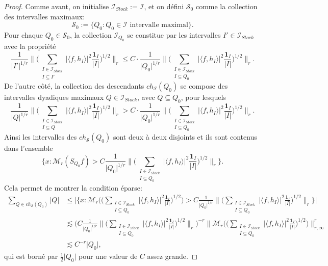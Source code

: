 \documentclass[11pt]{amsart}
\newcommand{\one}{\mathbf{1}}
\newcommand{\ii}{\mathscr}
\newcommand{\ic}{\mathcal}
\begin{document}
\begin{proof}
Comme avant, on initialise $\ii I_{Stock}:= \ii I$, et on d\'efini $\ic S_0$ comme la collection des intervalles maximaux: 
$$\ic S_0:=\lbrace Q_0: Q_0 \in \ii I \text{  intervalle maximal}  \rbrace.$$
Pour chaque $Q_0 \in \ic S_0$, la collection $\ii I_{Q_0}$ se constitue par les intervalles $I' \in \ii I_{Stock}$ avec la propri\'et\'e
\[
\frac{1}{\vert I' \vert^{1/r}} \big\| \big(  \sum_{\substack{I \in \ii I_{Stock} \\ I \subseteq I'}}  \vert \langle f, h_I  \rangle \vert^2 \frac{\one_I}{\vert I \vert} \big)^{1/2} \big\|_r \leq C \cdot \frac{1}{\vert Q_0 \vert^{1/r}} \big\| \big(  \sum_{\substack{I \in \ii I_{Stock} \\ I \subseteq Q_0}} \vert \langle f, h_I  \rangle \vert^2 \frac{\one_I}{\vert I \vert} \big)^{1/2} \big\|_r.
\]
De l'autre c\^ot\'e, la collection des descendants $ch_{\ic S}(Q_0)$ se compose des intervalles dyadiques maximaux $Q \in \ii I_{Stock}$, avec $Q \subseteq Q_0$, pour lesquels 
\[
\frac{1}{\vert Q \vert^{1/r}} \big\| \big(  \sum_{\substack{I \in \ii I_{Stock} \\ I \subseteq Q}}  \vert \langle f, h_I  \rangle \vert^2 \frac{\one_I}{\vert I \vert} \big)^{1/2} \big\|_r > C \cdot \frac{1}{\vert Q_0 \vert^{1/r}} \big\| \big(  \sum_{\substack{I \in \ii I_{Stock} \\ I \subseteq Q_0}} \vert \langle f, h_I  \rangle \vert^2 \frac{\one_I}{\vert I \vert} \big)^{1/2} \big\|_r.
\]
Ainsi les intervalles des $ch_{\ic S}(Q_0)$ sont deux \`a deux disjoints et ils sont contenus dans l'ensemble 
\[
 \Big\lbrace x: {\ic M}_r \left( S_{Q_0} f \right)> C \frac{1}{\vert  Q_0 \vert ^{1/r}} \|  \big(  \sum_{\substack{I \in \ii I_{Stock} \\ I \subseteq Q_0}} \vert \langle f, h_I  \rangle \vert^2 \frac{\one_I}{\vert I \vert} \big)^{1/2} \|_r \Big\rbrace.
\]
Cela permet de montrer la condition \'eparse:
\begin{align*}
\sum_{Q \in ch_{\ic S}\left( Q_0 \right)} \vert Q \vert &\leq \big\vert \big\lbrace x: {\ic M}_r \big( \big(  \sum_{\substack{I \in \ii I_{Stock} \\ I \subseteq Q_0}} \vert \langle f, h_I  \rangle \vert^2 \frac{\one_I}{\vert I \vert} \big)^{1/2}\big)> C \frac{1}{\vert  Q_0 \vert ^{1/r}} \|  \big(  \sum_{\substack{I \in \ii I_{Stock} \\ I \subseteq Q_0}} \vert \langle f, h_I  \rangle \vert^2 \frac{\one_I}{\vert I \vert} \big)^{1/2} \|_r \big\rbrace  \big\vert \\
&\lesssim \big( C \frac{1}{\vert  Q_0 \vert ^{1/r}} \|  \big(  \sum_{\substack{I \in \ii I_{Stock} \\ I \subseteq Q_0}} \vert \langle f, h_I  \rangle \vert^2 \frac{\one_I}{\vert I \vert} \big)^{1/2} \|_r  \big)^{-r} \big\|  {\ic M}_r \big( \big(  \sum_{\substack{I \in \ii I_{Stock} \\ I \subseteq Q_0}} \vert \langle f, h_I  \rangle \vert^2 \frac{\one_I}{\vert I \vert} \big)^{1/2}\big) \big\|_{r,\infty}^r \\
&\lesssim C^{-r} \vert Q_0  \vert,
\end{align*}
qui est born\'e par $\frac{1}{2}\vert Q_0 \vert$ pour une valeur de $C$ assez grande. 


\end{proof}
\end{document}
